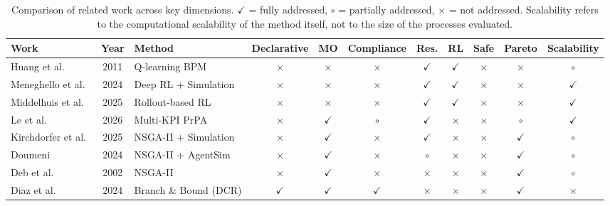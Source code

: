 \begin{table}
\centering
\caption{Comparison of related work across key dimensions.
$\checkmark$ = fully addressed, $\circ$ = partially addressed,
$\times$ = not addressed. Scalability refers to the computational
scalability of the method itself, not to the size of the processes
evaluated.}
\label{tab:lit_comparison}
\normalsize
\renewcommand{\arraystretch}{1.5}
\setlength{\tabcolsep}{6pt}
\begin{tabular}{@{}l c l *{8}{c}@{}}
\toprule
\textbf{Work} & \textbf{Year} & \textbf{Method}
& \textbf{Declarative} & \textbf{MO}
& \textbf{Compliance} & \textbf{Res.}
& \textbf{RL} & \textbf{Safe}
& \textbf{Pareto} & \textbf{Scalability}     \\
\midrule
Huang et al.~\cite{Huang2011ReinforcementManagement}      & 2011 & Q-learning BPM        & $\times$ & $\times$ & $\times$ & $\checkmark$ & $\checkmark$ & $\times$ & $\times$ & $\circ$ \\
Meneghello et al.~\cite{Meneghello2024OptimizingLearning} & 2024 & Deep RL + Simulation  & $\times$ & $\times$ & $\times$ & $\checkmark$ & $\checkmark$ & $\times$ & $\times$ & $\checkmark$ \\
Middelhuis et al.~\cite{Middelhuis2025LearningProcesses}  & 2025 & Rollout-based RL      & $\times$ & $\times$ & $\times$ & $\checkmark$ & $\checkmark$ & $\times$ & $\times$ & $\checkmark$ \\
\addlinespace
Le et al.~\cite{Le2026BalancingAnalytics}                 & 2026 & Multi-KPI PrPA        & $\times$ & $\checkmark$ & $\circ$ & $\checkmark$ & $\times$ & $\times$ & $\circ$ & $\checkmark$ \\
Kirchdorfer et al.~\cite{KirchdorferLukasFromPolicies}    & 2025 & NSGA-II + Simulation  & $\times$ & $\checkmark$ & $\times$ & $\checkmark$ & $\times$ & $\times$ & $\checkmark$ & $\circ$ \\
Doumeni~\cite{ArtemisDoumeniParetoAgentSimulator}         & 2024 & NSGA-II + AgentSim    & $\times$ & $\checkmark$ & $\times$ & $\circ$ & $\times$ & $\times$ & $\checkmark$ & $\circ$ \\
Deb et al.~\cite{Deb2002ANSGA-II}                         & 2002 & NSGA-II               & $\times$ & $\checkmark$ & $\times$ & $\times$ & $\times$ & $\times$ & $\checkmark$ & $\circ$ \\
\addlinespace
Diaz et al.~\cite{Diaz2024Pareto-OptimalModels}           & 2024 & Branch \& Bound (DCR) & $\checkmark$ & $\checkmark$ & $\checkmark$ & $\times$ & $\times$ & $\times$ & $\checkmark$ & $\times$ \\

\end{tabular}
\end{table}
